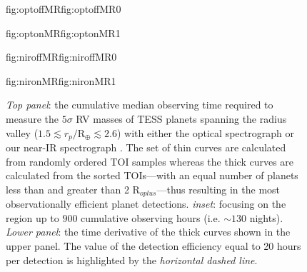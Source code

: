 \begin{figure}
  \centering
  \hspace{-\hsize}%
  \begin{ocg}{fig:optoffMR}{fig:optoffMR}{0}%
  \end{ocg}%
  \begin{ocg}{fig:optonMR}{fig:optonMR}{1}%
  \end{ocg}
  \hspace{-\hsize}%
  \begin{ocg}{fig:niroffMR}{fig:niroffMR}{0}%
  \end{ocg}%
  \begin{ocg}{fig:nironMR}{fig:nironMR}{1}%
  \end{ocg}
  \hspace{-\hsize}%
  \caption{\emph{Top panel}: the cumulative median observing time required to measure the $5\sigma$
    RV masses of
    TESS planets spanning the radius valley ($1.5 \lesssim r_p/\text{R}_{\oplus} \lesssim 2.6$)
    with either the optical spectrograph
     or our
    near-IR spectrograph 
    . The set of 
    thin curves are calculated from randomly ordered TOI samples whereas the thick curves are
    calculated from the sorted TOIs---with an equal number of planets less than and greater than
    2 R$_{oplus}$---thus resulting in the most observationally efficient planet
    detections. \emph{inset}: focusing on the region up to $900$ cumulative observing hours (i.e.
    $\sim 130$ nights). \emph{Lower panel}: the time derivative of the thick curves shown in the upper panel.
    The value of the detection efficiency equal to 20 hours per detection is highlighted
    by the \emph{horizontal dashed line}.}
  \label{fig:cumulativeMR}
\end{figure}



